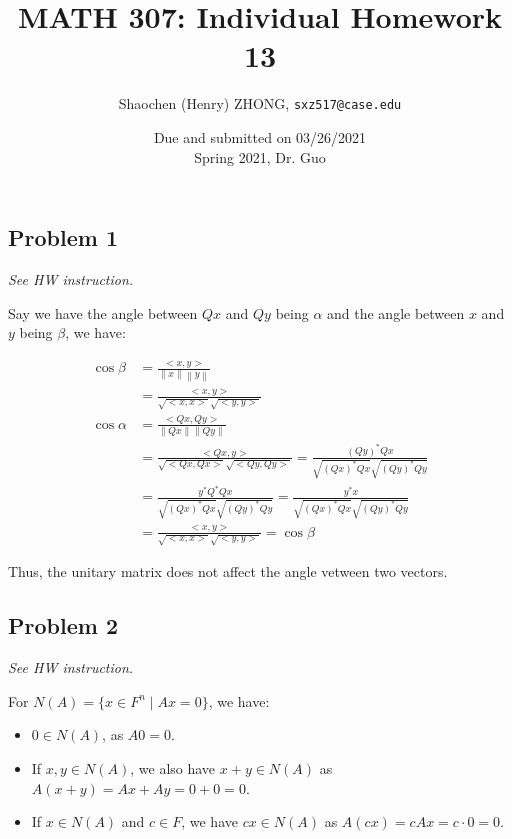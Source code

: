 \documentclass[11pt]{article}
\newcommand{\ilc}{\texttt}
\providecommand{\norm}[1]{\left\lVert #1 \right\rVert}
\begin{document}
\title{\textbf{MATH 307: Individual Homework 13}}


\author{Shaochen (Henry) ZHONG, \ilc{sxz517@case.edu}}

\date{Due and submitted on 03/26/2021 \\ Spring 2021, Dr. Guo}
\maketitle



\subsection*{Problem 1}
\textit{See HW instruction.}\newline

Say we have the angle between $Qx$ and $Qy$ being $\alpha$ and the angle between $x$ and $y$ being $\beta$, we have:

\begin{align*}
    \cos \beta &= \frac{<x, y>}{\norm{x} \norm{y}} \\
    &=\frac{<x, y>}{\sqrt{<x, x>} \sqrt{<y, y>}} \\
    \cos \alpha &= \frac{<Qx, Qy>}{\norm{Qx} \norm{Qy}} \\
    &=\frac{<Qx, y>}{\sqrt{<Qx, Qx>} \sqrt{<Qy, Qy>}} = \frac{(Qy)^* Qx}{\sqrt{(Qx)^* Qx}\sqrt{(Qy)^* Qy}} \\
    &= \frac{y^* Q^* Qx}{\sqrt{(Qx)^* Qx}\sqrt{(Qy)^* Qy}} = \frac{y^* x}{\sqrt{(Qx)^* Qx}\sqrt{(Qy)^* Qy}} \\
    &= \frac{<x, y>}{\sqrt{<x, x>} \sqrt{<y, y>}} = \cos \beta
\end{align*}

Thus, the unitary matrix does not affect the angle vetween two vectors.

\subsection*{Problem 2}
\textit{See HW instruction.}\newline

For $N(A) = \{x \in F^n \mid Ax = 0 \}$, we have:

\begin{itemize}
    \item $0 \in N(A)$, as $A0 = 0$.
    \item If $x, y \in N(A)$, we also have $x + y \in N(A)$ as $A(x + y) = Ax + Ay = 0 + 0 = 0$.
    \item If $x \in N(A)$ and $c \in F$, we have $cx \in N(A)$ as $A(cx) = cAx = c \cdot 0 = 0$.
\end{itemize}
\end{document}
